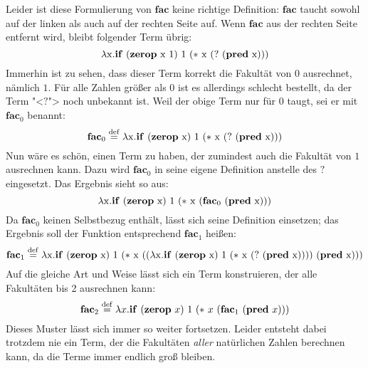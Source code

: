 Leider ist diese Formulierung von $\mathbf{fac}$ keine richtige
Definition: $\mathbf{fac}$ taucht sowohl auf der linken
als auch auf der rechten Seite auf.  Wenn $\mathbf{fac}$ aus der
rechten Seite entfernt wird, bleibt folgender Term übrig:
%
\begin{displaymath}
  \lambda \mathrm x.\mathbf{if}~(\mathbf{zerop}~\mathrm x~1)~1~(\ast~\mathrm x~(?~(\mathbf{pred}~\mathrm x)))
\end{displaymath}
%
Immerhin ist zu sehen, dass dieser Term korrekt die Fakultät von $0$
ausrechnet, nämlich $1$.  Für alle Zahlen größer als $0$ ist es allerdings
schlecht bestellt, da der Term "<$?$"> noch unbekannt ist.
Weil der obige Term nur für $0$ taugt, sei er mit $\mathbf{fac}_0$
benannt:
%
\begin{displaymath}
  \mathbf{fac}_0 \stackrel{\rm def}{=} \lambda \mathrm x.\mathbf{if}~(\mathbf{zerop}~\mathrm x)~1~(\ast~\mathrm x~(?~(\mathbf{pred}~\mathrm x)))
\end{displaymath}
%
Nun wäre es schön, einen Term zu haben, der zumindest auch die
Fakultät von $1$ ausrechnen kann.  Dazu wird $\mathbf{fac}_0$ in
seine eigene Definition anstelle des $?$ eingesetzt.  Das Ergebnis
sieht so aus:
%
\begin{displaymath}
  \lambda \mathrm x.\mathbf{if}~(\mathbf{zerop}~\mathrm x)~1~(\ast~\mathrm x~(\mathbf{fac}_0~(\mathbf{pred}~\mathrm x)))
\end{displaymath}
%
Da $\mathbf{fac}_0$ keinen Selbstbezug enthält, lässt sich seine
Definition einsetzen; das Ergebnis soll der Funktion entsprechend
$\mathbf{fac}_1$ heißen:
%
\begin{displaymath}
  \mathbf{fac}_1 \stackrel{\rm def}{=}{} \lambda \mathrm x.\mathbf{if}~(\mathbf{zerop}~\mathrm x)~1~(\ast~\mathrm x~((\lambda \mathrm x.\mathbf{if}~(\mathbf{zerop}~\mathrm x)~1~(\ast~\mathrm x~(?~(\mathbf{pred}~\mathrm x))))~(\mathbf{pred}~\mathrm x)))
\end{displaymath}
%
Auf die gleiche Art und Weise lässt sich ein Term konstruieren, der
alle Fakultäten bis 2 ausrechnen kann:
%
\begin{displaymath}
  \mathbf{fac}_2 \stackrel{\rm def}{=}{} \lambda x.\mathbf{if}~(\mathbf{zerop}~x)~1~(\ast~x~(\mathbf{fac}_1~(\mathbf{pred}~x)))
\end{displaymath}
%
Dieses Muster lässt sich immer so weiter fortsetzen.  Leider entsteht
dabei trotzdem nie ein Term, der die Fakultäten \emph{aller}
natürlichen Zahlen berechnen kann, da die Terme immer endlich groß
bleiben.

